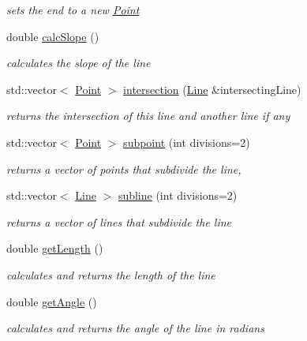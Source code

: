 \begin{DoxyCompactItemize}
\begin{DoxyCompactList}\small\item\em sets the end to a new \mbox{\hyperlink{class_jinks_draw_1_1_point}{Point}} \end{DoxyCompactList}\item 
double \mbox{\hyperlink{class_jinks_draw_1_1_line_aea73a9418815e5d255044a6dbce37e3e}{calc\+Slope}} ()
\begin{DoxyCompactList}\small\item\em calculates the slope of the line \end{DoxyCompactList}\item 
std\+::vector$<$ \mbox{\hyperlink{class_jinks_draw_1_1_point}{Point}} $>$ \mbox{\hyperlink{class_jinks_draw_1_1_line_a159d4850578aff530064d53c7461fa03}{intersection}} (\mbox{\hyperlink{class_jinks_draw_1_1_line}{Line}} \&intersecting\+Line)
\begin{DoxyCompactList}\small\item\em returns the intersection of this line and another line if any \end{DoxyCompactList}\item 
std\+::vector$<$ \mbox{\hyperlink{class_jinks_draw_1_1_point}{Point}} $>$ \mbox{\hyperlink{class_jinks_draw_1_1_line_a43d8f7b708f5e9851a188c755aa0d963}{subpoint}} (int divisions=2)
\begin{DoxyCompactList}\small\item\em returns a vector of points that subdivide the line, \end{DoxyCompactList}\item 
std\+::vector$<$ \mbox{\hyperlink{class_jinks_draw_1_1_line}{Line}} $>$ \mbox{\hyperlink{class_jinks_draw_1_1_line_a79047036e61d10ef3b14c660c32e6d64}{subline}} (int divisions=2)
\begin{DoxyCompactList}\small\item\em returns a vector of lines that subdivide the line \end{DoxyCompactList}\item 
double \mbox{\hyperlink{class_jinks_draw_1_1_line_aeb77107e932c68b88be7e32344db1de4}{get\+Length}} ()
\begin{DoxyCompactList}\small\item\em calculates and returns the length of the line \end{DoxyCompactList}\item 
double \mbox{\hyperlink{class_jinks_draw_1_1_line_ae344d8ad62e6044cfa2a5d31e1262d00}{get\+Angle}} ()
\begin{DoxyCompactList}\small\item\em calculates and returns the angle of the line in radians \end{DoxyCompactList}\end{DoxyCompactItemize}
